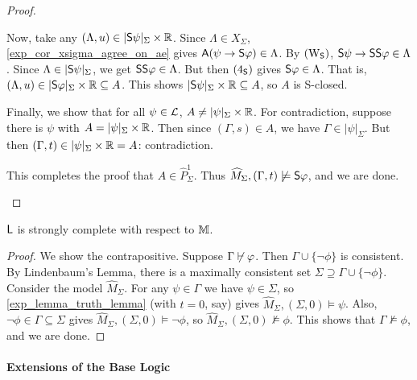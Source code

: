 \begin{proof}
\begin{itemize}
    Now, take any $(\Lambda, u) \in |\S\psi|_\Sigma \times \R$.
    Since $\Lambda \in X_\Sigma$, \cref{exp_cor_xsigma_agree_on_ae} gives
    $\A(\psi \limplies \S\phi) \in \Lambda$. By $\weakeningS$,
    $\S\psi \limplies \S\S\phi \in \Lambda$. Since $\Lambda \in
    |\S\psi|_\Sigma$, we get $\S\S\phi \in \Lambda$. But then
    $\foursoundness$ gives $\S\phi \in \Lambda$. That is, $(\Lambda,
    u) \in |\S\phi|_\Sigma \times \R \subseteq A$. This shows
    $|\S\psi|_\Sigma \times \R \subseteq A$, so $A$ is
    S-closed.

    Finally, we show that for all $\psi \in \cL$, $A \ne
    |\psi|_\Sigma \times \R$.  For contradiction, suppose there is
    $\psi$ with $A = |\psi|_\Sigma \times \R$. Then since $(\Gamma,
    s) \in A$, we have $\Gamma \in |\psi|_\Sigma$. But then $(\Gamma,
    t) \in |\psi|_\Sigma \times \R = A$: contradiction.

    This completes the proof that $A \in \widehat{P}_\Sigma^1$.  Thus
    $\widehat{M}_\Sigma, (\Gamma, t) \not\models \S\phi$, and we are done.
    \end{itemize}
\end{proof}

\begin{theorem}
\label{exp_thm_strong_completeness}
    $\sL$ is strongly complete\footnotemark{} with respect to $\M$.
\end{theorem}


\begin{proof}
We show the contrapositive. Suppose $\Gamma \not\entails \phi$.
Then $\Gamma \cup \{\neg\phi\}$ is consistent. By Lindenbaum's
Lemma, there is a maximally consistent set $\Sigma \supseteq \Gamma
\cup \{\neg\phi\}$. Consider the model $\widehat{M}_\Sigma$. For
any $\psi \in \Gamma$ we have $\psi \in \Sigma$, so
\cref{exp_lemma_truth_lemma} (with $t = 0$, say) gives
$\widehat{M}_\Sigma, (\Sigma, 0) \models \psi$. Also,
$\neg\phi \in \Gamma \subseteq \Sigma$ gives
$\widehat{M}_\Sigma, (\Sigma, 0) \models \neg\phi$, so
$\widehat{M}_\Sigma, (\Sigma, 0) \not\models \phi$. This shows that
$\Gamma \not\models \phi$, and we are done.
\end{proof}

\paragraph{Extensions of the Base Logic}

